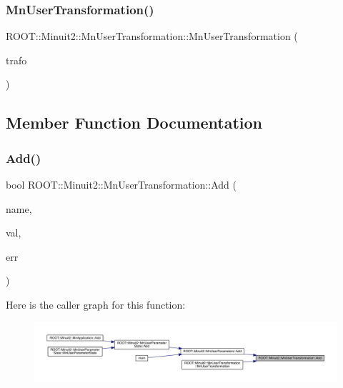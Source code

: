 \subsubsection{\texorpdfstring{MnUserTransformation()}{MnUserTransformation()}\hspace{0.1cm}{\footnotesize\ttfamily [9/9]}}
{\footnotesize\ttfamily R\+O\+O\+T\+::\+Minuit2\+::\+Mn\+User\+Transformation\+::\+Mn\+User\+Transformation (\begin{DoxyParamCaption}\item[{const \mbox{\hyperlink{classROOT_1_1Minuit2_1_1MnUserTransformation}{Mn\+User\+Transformation}} \&}]{trafo }\end{DoxyParamCaption})\hspace{0.3cm}{\ttfamily [inline]}}



\subsection{Member Function Documentation}
\mbox{\label{classROOT_1_1Minuit2_1_1MnUserTransformation_a2ddcd7b0cc5234b386407d7a76db1720}} 
\subsubsection{\texorpdfstring{Add()}{Add()}\hspace{0.1cm}{\footnotesize\ttfamily [1/9]}}
{\footnotesize\ttfamily bool R\+O\+O\+T\+::\+Minuit2\+::\+Mn\+User\+Transformation\+::\+Add (\begin{DoxyParamCaption}\item[{const std\+::string \&}]{name,  }\item[{double}]{val,  }\item[{double}]{err }\end{DoxyParamCaption})}

Here is the caller graph for this function\+:
\nopagebreak
\begin{figure}[H]
\begin{center}
\leavevmode
\includegraphics[width=350pt]{d9/d98/classROOT_1_1Minuit2_1_1MnUserTransformation_a2ddcd7b0cc5234b386407d7a76db1720_icgraph}
\end{center}
\end{figure}
\mbox{\label{classROOT_1_1Minuit2_1_1MnUserTransformation_a2ddcd7b0cc5234b386407d7a76db1720}} 
